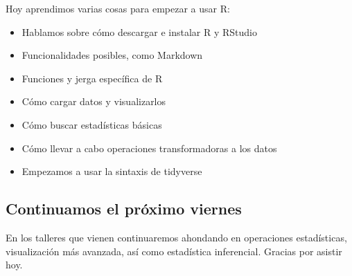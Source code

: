 \documentclass[
]{article}
\providecommand{\tightlist}{%
  \setlength{\itemsep}{0pt}\setlength{\parskip}{0pt}}
\begin{document}
Hoy aprendimos varias cosas para empezar a usar R:

\begin{itemize}
\tightlist
\item
  Hablamos sobre cómo descargar e instalar R y RStudio
\item
  Funcionalidades posibles, como Markdown
\item
  Funciones y jerga específica de R
\item
  Cómo cargar datos y visualizarlos
\item
  Cómo buscar estadísticas básicas
\item
  Cómo llevar a cabo operaciones transformadoras a los datos
\item
  Empezamos a usar la sintaxis de tidyverse
\end{itemize}

\subsection{Continuamos el próximo
viernes}\label{continuamos-el-pruxf3ximo-viernes}

En los talleres que vienen continuaremos ahondando en operaciones
estadísticas, visualización más avanzada, así como estadística
inferencial. Gracias por asistir hoy.
\end{document}
